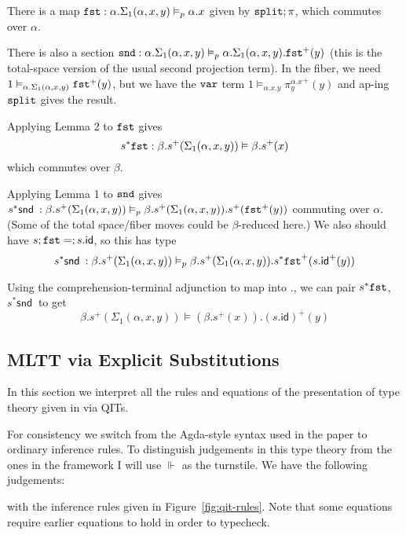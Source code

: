 \documentclass[10pt]{article}
\theoremstyle{definition}
\newcommand\dsd[1]{\ensuremath{\mathsf{#1}}}
\newcommand{\CTX}{\,\,\mathsf{Ctx}}
\newcommand{\TYPE}{\,\,\mathsf{Type}}
\newcommand{\app}[2]{\ensuremath{#1 \: #2}}
\newcommand{\snd}[1]{\app{\dsd{snd}}{#1}}
\newcommand{\id}{\mathsf{id}}
\newcommand\TrPlus[2]{\ensuremath{{#1}^+(#2)}}
\begin{document}
\begin{enumerate}
  There is a map $\mathtt{fst} : \alpha.\Sigma_1(\alpha,x,y) \vDash_p
  \alpha.x$ given by $\mathtt{split};\pi$, which commutes over $\alpha$.

  There is also a section $\mtt{snd} : \alpha.\Sigma_1(\alpha,x,y)
  \vDash_p \alpha.\Sigma_1(\alpha,x,y).\TrPlus{\mtt{fst}}{y}$ (this is
  the total-space version of the usual second projection term).  In the
  fiber, we need $1 \vDash_{\alpha.\Sigma_1(\alpha,x,y)}
  \TrPlus{\mtt{fst}}{y}$, but we have the $\mathtt{var}$ term $1
  \vDash_{\alpha.x.y} \TrPlus{\pi^{\alpha.x}_y}{y}$ and ap-ing
  $\mathtt{split}$ gives the result.
  
  Applying Lemma 2 to $\mathtt{fst}$ gives
  \[s^*{\mtt{fst}} : \beta.\TrPlus{s}{\Sigma_1(\alpha,x,y)} \vDash \beta.\TrPlus{s}{x}
  \]
  which commutes over $\beta$.

  Applying Lemma 1 to $\mathtt{snd}$ gives $s^*{\snd{}} :
  \beta.\TrPlus{s}{\Sigma_1(\alpha,x,y)} \vDash_p
  \beta.\TrPlus{s}{\Sigma_1(\alpha,x,y)}.\TrPlus{s}{\TrPlus{\mtt{fst}}{y}}$
  commuting over $\alpha$.  (Some of the total space/fiber moves could
  be $\beta$-reduced here.)
  We also should have $s;\mtt{fst} = ;{s.\id}$, so this has type
  \[
  s^*{\snd{}} : \beta.\TrPlus{s}{\Sigma_1(\alpha,x,y)} \vDash_p
  \beta.\TrPlus{s}{\Sigma_1(\alpha,x,y)}.\TrPlus{s^*\mtt{fst}}{\TrPlus{s.\id}{y}}
  \]
  
  Using the comprehension-terminal adjunction to map into $.$, we can
  pair $s^*{\mathtt{fst}}$, $s^*{\snd{}}$
  to get
  \[
  \beta.\TrPlus{s}{\Sigma_1(\alpha,x,y)} \vDash (\beta.\TrPlus{s}{x}).{\TrPlus{(s.\id)}{y}}
  \]
  
\end{enumerate}
  
\subsection{MLTT via Explicit Substitutions}
\newcommand{\qyields}{\Vdash} \newcommand{\varsof}[1]{{#1}^\dagger}
\newcommand{\upstairs}[1]{\overline{#1}}
\newcommand{\downstairs}[1]{\underline{#1}}
\newcommand{\asdep}[1]{{#1}_p}
\newcommand\proj[1]{\ensuremath{\mathsf{proj}_{#1}}}
\newcommand\var[1]{\ensuremath{\mathsf{var}_{#1}}}
\newcommand\outof[1]{\ensuremath{\mathsf{outof}_{#1}}}
\newcommand\into[1]{\ensuremath{\mathsf{into}_{#1}}}

In this section we interpret all the rules and equations of the presentation of type theory given in \cite{altenkirchkaposi16qit} via QITs. 

For consistency we switch from the Agda-style syntax used in the paper to ordinary inference rules. To distinguish judgements in this type theory from the ones in the framework I will use $\qyields$ as the turnstile.  We have the following judgements:
with the inference rules given in Figure~\ref{fig:qit-rules}. Note that some equations require earlier equations to hold in order to typecheck.
\end{document}
